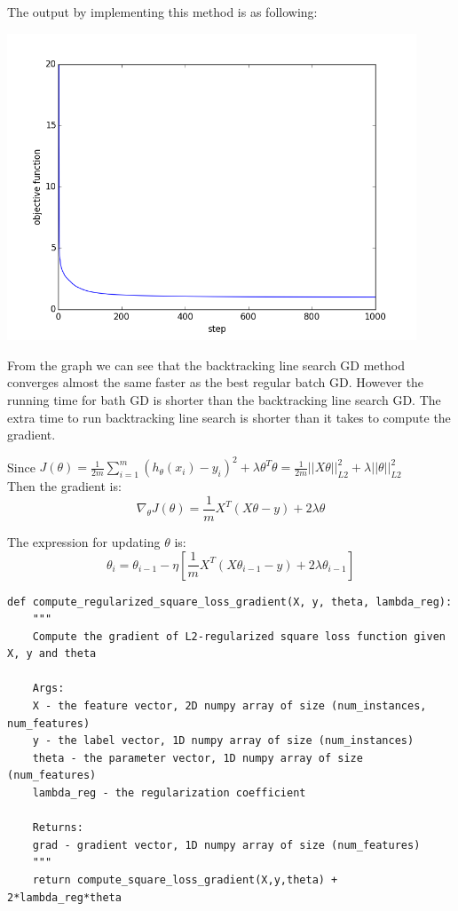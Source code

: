 \documentclass{article}
\newenvironment{problem}[2][$\bullet$]{\begin{trivlist}\large
		\item[\hskip \labelsep {\bfseries #1}\hskip \labelsep {\bfseries #2.}]}  {\end{trivlist}}
\newenvironment{sub}[2][$-$]{\begin{trivlist}
		\item[\hskip \labelsep {\bfseries #1}\hskip \labelsep {\bfseries #2.}]}  {\end{trivlist}}
\begin{document}
The output by implementing this method is as following: 
\begin{center}
	\includegraphics[height = 3.6in]{2_4_3.png}
\end{center}

From the graph we can see that the backtracking line search GD method converges almost the same faster as the best regular batch GD. However the running time for bath GD is shorter than the  backtracking line search GD. The extra time to run backtracking line search is shorter than it takes to compute the gradient. 

\begin{problem}{Ridge Regression}
\end{problem}

\begin{sub}{2.5.1}
\end{sub} 

Since $J(\theta)  = \frac{1}{2m} \sum_{i=1}^{m} (h_{\theta}(x_i) - y_i)^2 + \lambda \theta^T \theta=  \frac{1}{2m} ||X \theta||_{L2}^2 + \lambda ||\theta||_{L2}^2$\\
Then the gradient is:
$$\nabla_{\theta} J(\theta) = \frac{1}{m} X^T(X\theta - y) + 2\lambda \theta$$

The expression for updating $\theta$ is:
$$\theta_{i} = \theta_{i - 1 } -\eta[ \frac{1}{m} X^T(X\theta_{i-1} - y) + 2\lambda \theta_{i-1}]$$

\begin{sub}{2.5.2}
\end{sub}

\begin{verbatim}
def compute_regularized_square_loss_gradient(X, y, theta, lambda_reg):
	"""
	Compute the gradient of L2-regularized square loss function given X, y and theta
	
	Args:
	X - the feature vector, 2D numpy array of size (num_instances, num_features)
	y - the label vector, 1D numpy array of size (num_instances)
	theta - the parameter vector, 1D numpy array of size (num_features)
	lambda_reg - the regularization coefficient
	
	Returns:
	grad - gradient vector, 1D numpy array of size (num_features)
	"""
	return compute_square_loss_gradient(X,y,theta) + 2*lambda_reg*theta 
\end{verbatim}
\end{document}

